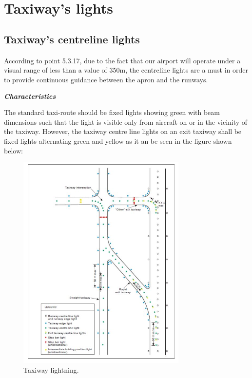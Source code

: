 	\section{Taxiway's lights}
		\subsection{Taxiway's centreline lights}
		\paragraph{}According to point 5.3.17, due to the fact that our airport will operate under a visual range of less than a value of 350m, the centreline lights are a must in order to provide continuous guidance between the apron and the runways.
		
		\textbf{\textit{Characteristics}}
		
		The standard taxi-route should be fixed lights showing green with beam dimensions such that the light is visible only from aircraft on or in the vicinity of the taxiway. However, the taxiway centre line lights on an exit taxiway shall be fixed lights alternating green and yellow as it an be seen in the figure shown below:
			
		\begin{figure}[H]
			\centering
			\includegraphics[clip, trim=0cm 0cm 0cm 0cm, width=0.75\textwidth]{./images/lights/taxiwaylights}
			\caption{Taxiway lightning.} %
			\label{taxilight} %
		\end{figure}
		
